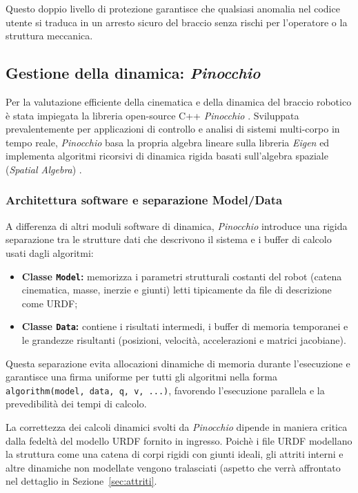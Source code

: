 Questo doppio livello di protezione garantisce che qualsiasi anomalia nel codice utente si traduca in un arresto sicuro del braccio senza rischi per l'operatore o la struttura meccanica.

\subsection{Gestione della dinamica: \textit{Pinocchio}}

Per la valutazione efficiente della cinematica e della dinamica del braccio robotico è stata impiegata la libreria open-source C++ \textit{Pinocchio} \cite{pinocchio}. Sviluppata prevalentemente per applicazioni di controllo e analisi di sistemi multi-corpo in tempo reale, \textit{Pinocchio} basa la propria algebra lineare sulla libreria \textit{Eigen} ed implementa algoritmi ricorsivi di dinamica rigida basati sull'algebra spaziale (\textit{Spatial Algebra}) \cite{pinocchio}.

\subsubsection{Architettura software e separazione Model/Data}
A differenza di altri moduli software di dinamica, \textit{Pinocchio} introduce una rigida separazione tra le strutture dati che descrivono il sistema e i buffer di calcolo usati dagli algoritmi:
\begin{itemize}
    \item \textbf{Classe \texttt{Model}:} memorizza i parametri strutturali costanti del robot (catena cinematica, masse, inerzie e giunti) letti tipicamente da file di descrizione come URDF;
    \item \textbf{Classe \texttt{Data}:} contiene i risultati intermedi, i buffer di memoria temporanei e le grandezze risultanti (posizioni, velocità, accelerazioni e matrici jacobiane).
\end{itemize}

Questa separazione evita allocazioni dinamiche di memoria durante l'esecuzione e garantisce una firma uniforme per tutti gli algoritmi nella forma \texttt{algorithm(model, data, q, v, ...)}, favorendo l'esecuzione parallela e la prevedibilità dei tempi di calcolo.

La correttezza dei calcoli dinamici svolti da \textit{Pinocchio} dipende in maniera critica dalla fedeltà del modello URDF fornito in ingresso. Poichè i file URDF modellano la struttura come una catena di corpi rigidi con giunti ideali, gli attriti interni e altre dinamiche non modellate vengono tralasciati (aspetto che verrà affrontato nel dettaglio in Sezione~\ref{sec:attriti}.

